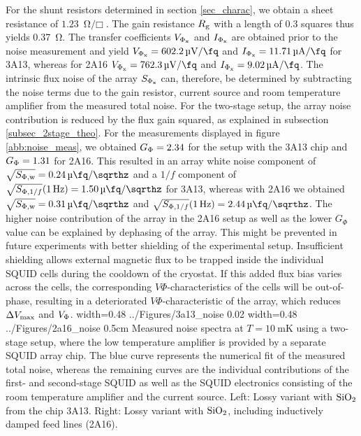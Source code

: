 For the shunt resistors determined in section \ref{sec_charac}, we obtain a sheet resistance of $\qty{1.23}{\ohm\per\Box}$. The gain resistance $R_{\rm g}$ with a length of 0.3 squares thus yields \qty{0.37}{\ohm}. The transfer coefficients $V_{\rm \Phi_x}$ and $I_{\rm \Phi_x}$ are obtained prior to the noise measurement and yield $V_{\rm \Phi_x}=\qty{602.2}{\micro\volt\per\fq}$ and $I_{\rm \Phi_x}=\qty{11.71}{\micro\ampere\per\fq}$ for 3A13, whereas for 2A16 $V_{\rm \Phi_x}=\qty{762.3}{\micro\volt\per\fq}$ and $I_{\rm \Phi_x}=\qty{9.02}{\micro\ampere\per\fq}$. The intrinsic flux noise of the array $S_{\rm \Phi_x}$ can, therefore, be determined by subtracting the noise terms due to the gain resistor, current source and room temperature amplifier from the measured total noise. For the two-stage setup, the array noise contribution is reduced by the flux gain squared, as explained in subsection \ref{subsec_2stage_theo}. For the measurements displayed in figure \ref{abb:noise_meas}, we obtained $G_{\rm \Phi}=2.34$ for the setup with the 3A13 chip and $G_{\rm \Phi}=1.31$ for 2A16. This resulted in an array white noise component of $\sqrt{S_{\rm \Phi,w}}=\qty{0.24}{\micro\fq\per\sqrthz}$ and a $1/f$ component of $\sqrt{S_{{\rm \Phi},1/f}}(\qty{1}{\Hz})=\qty{1.50}{\micro\fq\per\sqrthz}$ for 3A13, whereas with 2A16 we obtained $\sqrt{S_{\rm \Phi,w}}=\qty{0.31}{\micro\fq\per\sqrthz}$ and $\sqrt{S_{{\rm \Phi},1/f}}(\qty{1}{\Hz})=\qty{2.44}{\micro\fq\per\sqrthz}$. The higher noise contribution of the array in the 2A16 setup as well as the lower $G_\Phi$ value can be explained by dephasing of the array. This might be prevented in future experiments with better shielding of the experimental setup. Insufficient shielding allows external magnetic flux to be trapped inside the individual SQUID cells during the cooldown of the cryostat. If this added flux bias varies across the cells, the corresponding $V\Phi$-characteristics of the cells will be out-of-phase, resulting in a deteriorated $V\Phi$-characteristic of the array, which reduces $\Delta V_{\rm max}$ and $V_{\rm \Phi}$.
{width=0.48\textwidth}
{../Figures/3a13_noise}
{0.02\textwidth} %
{width=0.48\textwidth}
{../Figures/2a16_noise}
{0.5cm} %
{Measured noise spectra at $T=\qty{10}{\milli\kelvin}$ using a two-stage setup, where the low temperature amplifier is provided by a separate SQUID array chip. The blue curve represents the numerical fit of the measured total noise, whereas the remaining curves are the individual contributions of the first- and second-stage SQUID as well as the SQUID electronics consisting of the room temperature amplifier and the current source. Left: Lossy variant with ${\rm SiO_2}$ from the chip 3A13. Right: Lossy variant with ${\rm SiO_2}$, including inductively damped feed lines (2A16).}
